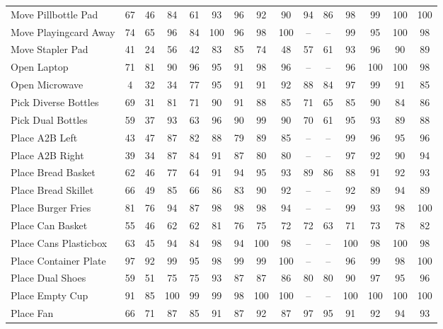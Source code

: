 \documentclass{llmxive}
\begin{document}
\begin{table}[tp]
{\begin{tabular}{l*{14}{c}}
        Move Pillbottle Pad         & 67 & 46 & 84 & 61 & 93 & 96 & 92 & 90 & 94 & 86 & 98 & 99 & 100 & 100 \\
        Move Playingcard Away       & 74 & 65 & 96 & 84 & 100 & 96 & 98 & 100 & -- & -- & 99 & 95 & 100 & 98 \\
        Move Stapler Pad            & 41 & 24 & 56 & 42 & 83 & 85 & 74 & 48 & 57 & 61 & 93 & 96 & 90 & 89 \\
        Open Laptop                 & 71 & 81 & 90 & 96 & 95 & 91 & 98 & 96 & -- & -- & 96 & 100 & 100 & 98 \\
        Open Microwave              & 4 & 32 & 34 & 77 & 95 & 91 & 91 & 92 & 88 & 84 & 97 & 99 & 91 & 85 \\
        Pick Diverse Bottles        & 69 & 31 & 81 & 71 & 90 & 91 & 88 & 85 & 71 & 65 & 85 & 90 & 84 & 86 \\
        Pick Dual Bottles           & 59 & 37 & 93 & 63 & 96 & 90 & 99 & 90 & 70 & 61 & 95 & 93 & 89 & 88 \\
        Place A2B Left              & 43 & 47 & 87 & 82 & 88 & 79 & 89 & 85 & -- & -- & 99 & 96 & 95 & 96 \\
        Place A2B Right             & 39 & 34 & 87 & 84 & 91 & 87 & 80 & 80 & -- & -- & 97 & 92 & 90 & 94 \\
        Place Bread Basket          & 62 & 46 & 77 & 64 & 91 & 94 & 95 & 93 & 89 & 86 & 88 & 91 & 92 & 93 \\
        Place Bread Skillet         & 66 & 49 & 85 & 66 & 86 & 83 & 90 & 92 & -- & -- & 92 & 89 & 94 & 89 \\
        Place Burger Fries          & 81 & 76 & 94 & 87 & 98 & 98 & 98 & 94 & -- & -- & 99 & 93 & 98 & 100 \\
        Place Can Basket            & 55 & 46 & 62 & 62 & 81 & 76 & 75 & 72 & 72 & 63 & 71 & 73 & 78 & 82 \\
        Place Cans Plasticbox       & 63 & 45 & 94 & 84 & 98 & 94 & 100 & 98 & -- & -- & 100 & 98 & 100 & 98 \\
        Place Container Plate       & 97 & 92 & 99 & 95 & 98 & 99 & 99 & 100 & -- & -- & 96 & 99 & 98 & 100 \\
        Place Dual Shoes            & 59 & 51 & 75 & 75 & 93 & 87 & 87 & 86 & 80 & 80 & 90 & 97 & 95 & 96 \\
        Place Empty Cup             & 91 & 85 & 100 & 99 & 99 & 98 & 100 & 100 & -- & -- & 100 & 100 & 100 & 100 \\
        Place Fan                   & 66 & 71 & 87 & 85 & 91 & 87 & 92 & 87 & 97 & 95 & 91 & 92 & 94 & 93 \\

\end{tabular}}
\end{table}
\end{document}
